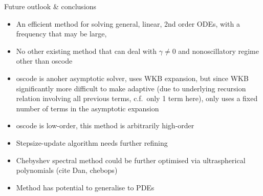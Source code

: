 \documentclass{beamer}
\numberwithin{equation}{theorem}
\begin{document}
\begin{noframe}
    Future outlook \& conclusions \\
    \medskip
    {\footnotesize
    \begin{itemize}
    \item{An efficient method for solving general, linear, 2nd order ODEs, with a frequency that may be large,}
    \item{No other existing method that can deal with $\gamma \neq 0$ and nonoscillatory regime other than oscode }
    \item{oscode is anoher asymptotic solver, uses WKB expansion, but since WKB significantly more difficult to make adaptive (due to underlying recursion relation involving all previous terms, c.f.\ only 1 term here), only uses a fixed number of terms in the asymptotic expansion}
    \item{oscode is low-order, this method is arbitrarily high-order}
    \end{itemize}
   }
   {\footnotesize
    \begin{itemize}
    \item{Stepsize-update algorithm needs further refining}
    \item{Chebyshev spectral method could be further optimised via ultraspherical polynomials (cite Dan, chebops)}
    \item{Method has potential to generalise to PDEs}
    \end{itemize}
   }
\end{noframe}

\end{document}
